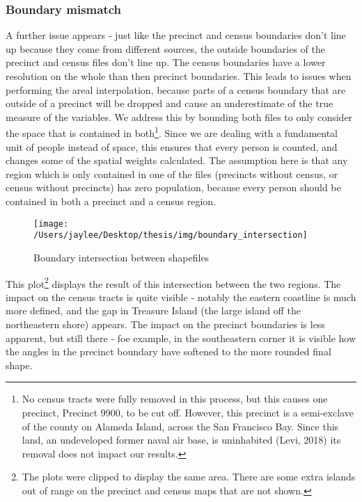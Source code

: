 \documentclass[12pt,twoside]{reedthesis}
\begin{document}
\hypertarget{boundary-mismatch}{%
\subsubsection{Boundary mismatch}\label{boundary-mismatch}}

A further issue appears - just like the precinct and census boundaries don't line up because they come from different sources, the outside boundaries of the precinct and census files don't line up. The census boundaries have a lower resolution on the whole than then precinct boundaries. This leads to issues when performing the areal interpolation, because parts of a census boundary that are outside of a precinct will be dropped and cause an underestimate of the true measure of the variables. We address this by bounding both files to only consider the space that is contained in both\footnote{No census tracts were fully removed in this process, but this causes one precinct, Precinct 9900, to be cut off. However, this precinct is a semi-exclave of the county on Alameda Island, across the San Francisco Bay. Since this land, an undeveloped former naval air base, is uninhabited (Levi, 2018) its removal does not impact our results.}. Since we are dealing with a fundamental unit of people instead of space, this ensures that every person is counted, and changes some of the spatial weights calculated. The assumption here is that any region which is only contained in one of the files (precincts without census, or census without precincts) has zero population, because every person should be contained in both a precinct and a census region.
\begin{figure}
\texttt{[image: /Users/jaylee/Desktop/thesis/img/boundary\_intersection]} \caption{Boundary intersection between shapefiles}\label{fig:unnamed-chunk-6}
\end{figure}
This plot\footnote{The plots were clipped to display the same area. There are some extra islands out of range on the precinct and census maps that are not shown.} displays the result of this intersection between the two regions. The impact on the census tracts is quite visible - notably the eastern coastline is much more defined, and the gap in Treasure Island (the large island off the northeastern shore) appears. The impact on the precinct boundaries is less apparent, but still there - foe example, in the southeastern corner it is visible how the angles in the precinct boundary have softened to the more rounded final shape.
\end{document}
